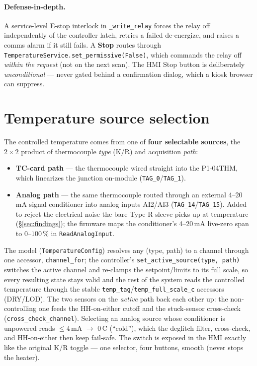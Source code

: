 \documentclass[11pt]{article}
\newcommand{\code}[1]{\texttt{#1}}
\begin{document}
\paragraph{Defense-in-depth.} A service-level E-stop interlock in
\code{\_write\_relay} forces the relay off independently of the controller latch,
retries a failed de-energize, and raises a comms alarm if it still fails. A
\textbf{Stop} routes through \code{TemperatureService.set\_permissive(False)},
which commands the relay off \emph{within the request} (not on the next scan). The
HMI Stop button is deliberately \emph{unconditional} --- never gated behind a
confirmation dialog, which a kiosk browser can suppress.

\section{Temperature source selection}\label{sec:source}
The controlled temperature comes from one of \textbf{four selectable sources},
the $2\times2$ product of thermocouple \emph{type} (K/R) and acquisition
\emph{path}:

\begin{itemize}[nosep]
  \item \textbf{TC-card path} --- the thermocouple wired straight into the
  P1-04THM, which linearizes the junction on-module (\code{TAG\_0}/\code{TAG\_1}).
  \item \textbf{Analog path} --- the same thermocouple routed through an external
  4--20\,mA signal conditioner into analog inputs AI2/AI3
  (\code{TAG\_14}/\code{TAG\_15}). Added to reject the electrical noise the bare
  Type-R sleeve picks up at temperature (\S\ref{sec:findings}); the firmware maps
  the conditioner's 4--20\,mA live-zero span to $0$--$100$\,\% in
  \code{ReadAnalogInput}.
\end{itemize}

\noindent The model (\code{TemperatureConfig}) resolves any (type, path) to a
channel through one accessor, \code{channel\_for}; the controller's
\code{set\_active\_source(type,\,path)} switches the active channel and re-clamps
the setpoint/limits to its full scale, so every resulting state stays valid and
the rest of the system reads the controlled temperature through the stable
\code{temp\_tag}/\code{temp\_full\_scale\_c} accessors (DRY/LOD). The two
sensors on the \emph{active} path back each other up: the non-controlling one
feeds the HH-on-either cutoff and the stuck-sensor cross-check
(\code{cross\_check\_channel}). Selecting an analog source whose conditioner is
unpowered reads $\le 4$\,mA $\rightarrow$ 0\,\textdegree C (``cold''), which the
deglitch filter, cross-check, and HH-on-either then keep fail-safe. The switch is
exposed in the HMI exactly like the original K/R toggle --- one selector, four
buttons, smooth (never stops the heater).
\end{document}
